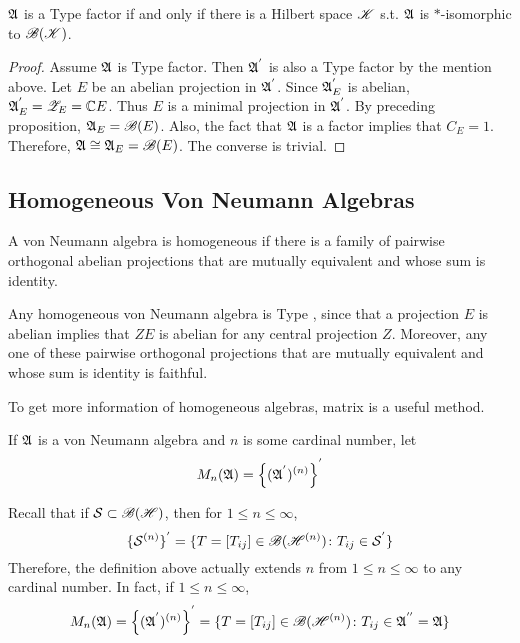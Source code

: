 \begin{thm}
	$\mathfrak{A}$ is a Type  factor if and only if there is a Hilbert space $\mathscr{K}$ s.t. $\mathfrak{A}$ is $*$-isomorphic to $\mathscr{B}(\mathscr{K})$. 
\end{thm}
\begin{proof}
	Assume $\mathfrak{A}$ is Type  factor. Then $\mathfrak{A}^{'}$ is also a Type  factor by the mention above. Let $E$ be an abelian projection in $\mathfrak{A}^{'}$. Since $\mathfrak{A}^{'}_E$ is abelian, $\mathfrak{A}^{'}_E = \mathscr{Z}_E = \mathbb{C} E$. Thus $E$ is a minimal projection in $\mathfrak{A}^{'}$. By preceding proposition, $\mathfrak{A}_E = \mathscr{B}(E)$. Also, the fact that $\mathfrak{A}$ is a factor implies that $C_E = 1$. Therefore, $\mathfrak{A} \cong \mathfrak{A}_E = \mathscr{B}(E)$. The converse is trivial.
\end{proof}

\subsection{Homogeneous Von Neumann Algebras}

\begin{defn}
	A von Neumann algebra is homogeneous if there is a family of pairwise orthogonal abelian projections that are mutually equivalent and whose sum is identity.
\end{defn}
\begin{rem}
	Any homogeneous von Neumann algebra is Type , since that a projection $E$ is abelian implies that $ZE$ is abelian for any central projection $Z$. Moreover, any one of these pairwise orthogonal projections that are mutually equivalent and whose sum is identity is faithful.
\end{rem}

To get more information of homogeneous algebras, matrix is a useful method.

\begin{defn}
	If $\mathfrak{A}$ is a von Neumann algebra and $n$ is some cardinal number, let
	\begin{equation*}
		M_n(\mathfrak{A}) = \left\{ (\mathfrak{A}^{'})^{(n)}\right\}^{'}
	\end{equation*}
\end{defn}
\begin{rem}
	Recall that if $\mathcal{S} \subset \mathscr{B(H)}$, then for $1 \leqslant n \leqslant \infty$,
	\begin{equation*}
		\{\mathcal{S}^{(n)}\}^{'} = \{T = [T_{ij}] \in \mathscr{B}(\mathscr{H}^{(n)}) \colon T_{ij} \in \mathcal{S}^{'}\} 
	\end{equation*}
	Therefore, the definition above actually extends $n$ from $1 \leqslant n \leqslant \infty$ to any cardinal number. In fact, if $1 \leqslant n \leqslant \infty$,
	\begin{equation*}
		M_n(\mathfrak{A}) = \left\{ (\mathfrak{A}^{'})^{(n)}\right\}^{'} = \{T = [T_{ij}] \in \mathscr{B}(\mathscr{H}^{(n)}) \colon T_{ij} \in \mathfrak{A}^{''} = \mathfrak{A}\}
	\end{equation*}
\end{rem}


